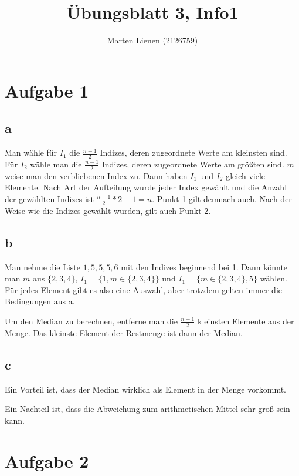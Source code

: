 \documentclass[a4paper,10pt]{article}
\title{Übungsblatt 3, Info1}
\author{Marten Lienen (2126759)}
\begin{document}
\maketitle

\section*{Aufgabe 1}

\subsection*{a}

Man wähle für $I_1$ die $\frac{n - 1}{2}$ Indizes, deren zugeordnete Werte am kleinsten sind.
Für $I_2$ wähle man die $\frac{n - 1}{2}$ Indizes, deren zugeordnete Werte am größten sind.
$m$ weise man den verbliebenen Index zu.
Dann haben $I_1$ und $I_2$ gleich viele Elemente.
Nach Art der Aufteilung wurde jeder Index gewählt und die Anzahl der gewählten Indizes ist $\frac{n - 1}{2} * 2 + 1 = n$.
Punkt 1 gilt demnach auch.
Nach der Weise wie die Indizes gewählt wurden, gilt auch Punkt 2.

\subsection*{b}

Man nehme die Liste $1, 5, 5, 5, 6$ mit den Indizes beginnend bei 1.
Dann könnte man $m$ aus $\{2, 3, 4\}$, $I_1 = \{1, m \in \{2, 3, 4\}\}$ und $I_1 = \{m \in \{2, 3, 4\}, 5\}$ wählen.
Für jedes Element gibt es also eine Auswahl, aber trotzdem gelten immer die Bedingungen aus a.

Um den Median zu berechnen, entferne man die $\frac{n - 1}{2}$ kleinsten Elemente aus der Menge.
Das kleinste Element der Restmenge ist dann der Median.

\subsection*{c}

Ein Vorteil ist, dass der Median wirklich als Element in der Menge vorkommt.

Ein Nachteil ist, dass die Abweichung zum arithmetischen Mittel sehr groß sein kann.

\section*{Aufgabe 2}
\end{document}
